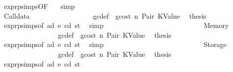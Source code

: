 \begin{isabellebody}
\ expr{\isachardot}{\kern0pt}psimps{\isacharparenleft}{\kern0pt}{}{\isacharparenright}{\kern0pt}{\isacharbrackleft}{\kern0pt}OF\ {}{}{\isacharparenleft}{\kern0pt}{}{\isacharparenright}{\kern0pt}{\isacharbrackright}{\kern0pt}\ \isamarkupfalse%
\ simp\isanewline
\ \ \ \ \ \ \ \ \ \ \ \ \ \ \isamarkupfalse%
\isanewline
\ \ \ \ \ \ \ \ \ \ \ \ \isamarkupfalse%
\isanewline
\ \ \ \ \ \ \ \ \ \ \ \ \ \ \isamarkupfalse%
\ {\isacharparenleft}{\kern0pt}Calldata\ {\isacharunderscore}{\kern0pt}{\isacharparenright}{\kern0pt}\isanewline
\ \ \ \ \ \ \ \ \ \ \ \ \ \ \isamarkupfalse%
\ {}{}\ gc{\isacharunderscore}{\kern0pt}def\ {\isacharasterisk}{\kern0pt}\ gcost\ n\ Pair\ KValue\ \isamarkupfalse%
\ {\isacharquery}{\kern0pt}thesis\ \isamarkupfalse%
\ expr{\isachardot}{\kern0pt}psimps{\isacharparenleft}{\kern0pt}{}{\isacharparenright}{\kern0pt}{\isacharbrackleft}{\kern0pt}of\ ad\ e\ cd\ st{\isacharbrackright}{\kern0pt}\ \isamarkupfalse%
\ simp\isanewline
\ \ \ \ \ \ \ \ \ \ \ \ \isamarkupfalse%
\isanewline
\ \ \ \ \ \ \ \ \ \ \ \ \ \ \isamarkupfalse%
\ {\isacharparenleft}{\kern0pt}Memory\ {\isacharunderscore}{\kern0pt}{\isacharparenright}{\kern0pt}\isanewline
\ \ \ \ \ \ \ \ \ \ \ \ \ \ \isamarkupfalse%
\ {}{}\ gc{\isacharunderscore}{\kern0pt}def\ {\isacharasterisk}{\kern0pt}\ gcost\ n\ Pair\ KValue\ \isamarkupfalse%
\ {\isacharquery}{\kern0pt}thesis\ \isamarkupfalse%
\ expr{\isachardot}{\kern0pt}psimps{\isacharparenleft}{\kern0pt}{}{\isacharparenright}{\kern0pt}{\isacharbrackleft}{\kern0pt}of\ ad\ e\ cd\ st{\isacharbrackright}{\kern0pt}\ \isamarkupfalse%
\ simp\isanewline
\ \ \ \ \ \ \ \ \ \ \ \ \isamarkupfalse%
\isanewline
\ \ \ \ \ \ \ \ \ \ \ \ \ \ \isamarkupfalse%
\ {\isacharparenleft}{\kern0pt}Storage\ {\isacharunderscore}{\kern0pt}{\isacharparenright}{\kern0pt}\isanewline
\ \ \ \ \ \ \ \ \ \ \ \ \ \ \isamarkupfalse%
\ {}{}\ gc{\isacharunderscore}{\kern0pt}def\ {\isacharasterisk}{\kern0pt}\ gcost\ n\ Pair\ KValue\ \isamarkupfalse%
\ {\isacharquery}{\kern0pt}thesis\ \isamarkupfalse%
\ expr{\isachardot}{\kern0pt}psimps{\isacharparenleft}{\kern0pt}{}{\isacharparenright}{\kern0pt}{\isacharbrackleft}{\kern0pt}of\ ad\ e\ cd\ st{\isacharbrackright}{\kern0pt}\ \isamarkupfalse%

\end{isabellebody}
